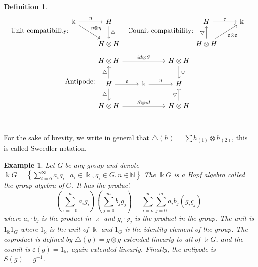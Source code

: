 \documentclass[12pt,a4paper]{article}
\newtheorem{example}[theorem]{Example}
\newtheorem{definition}[theorem]{Definition}
\newcommand\NN{\mathbb{N}}
\newcommand{\kk}{\Bbbk}
\newcommand\1{_{(1)}}
\newcommand\2{_{(2)}}
\begin{document}
\begin{definition}
\[\text{Unit compatibility:}\begin{tikzcd}
\kk \arrow[rd, "\eta\otimes\eta"] \arrow[r, "\eta"] & H \arrow[d, "\triangle"] \\
                                                    & H\otimes H              
\end{tikzcd}
\text{\;\;\;Counit compatibility:}
\begin{tikzcd}
H \arrow[r, "\varepsilon"]                                                         & \kk \\
H\otimes H \arrow[u, "\bigtriangledown"] \arrow[ru, "\varepsilon\otimes\varepsilon"'] &    
\end{tikzcd}
\]
\[
\text{Antipode:}
\begin{tikzcd}
H\otimes H \arrow[rr, "id\otimes S"]                                      &                       & H\otimes H \arrow[d, "\bigtriangledown"] \\
H \arrow[u, "\triangle"] \arrow[d, "\triangle"'] \arrow[r, "\varepsilon"] & \kk \arrow[r, "\eta"] & H                                     \\
H\otimes H \arrow[rr, "S\otimes id"]                                      &                       & H\otimes H \arrow[u, "\bigtriangledown"]
\end{tikzcd}
\]\\
\end{definition}

For the sake of brevity, we write in general that $\triangle(h)=\sum h\1\otimes h\2$, this is called Sweedler notation.\\

\begin{example}
    Let $G$ be any group and denote $\kk G=\left\{\sum_{i=0}^\infty a_i g_i\;\vert\; a_i\in\kk, g_i\in G, n\in\NN\right\}$
    The $\kk G$ is a Hopf algebra called the group algebra of $G$.
    It has the product
    \[
    \left(\sum_{i=-0}^n a_i g_i\right)\left(\sum_{j=0}^m b_j g_j\right)=\sum_{i=o}^n\sum_{j=0}^m a_i b_j (g_i g_j)
    \]
    where $a_i\cdot b_j$ is the product in $\kk$ and $g_i\cdot g_j$ is the product in the group.
    The unit is $1_\kk 1_G$ where $1_\kk$ is the unit of $\kk$ and $1_G$ is the identity element of the group.
    The coproduct is defined by $\triangle(g)=g\otimes g$ extended linearly to all of $\kk G$, and the counit is $\varepsilon(g)=1_\kk$, again extended linearly.
    Finally, the antipode is $S(g)=g^{-1}$.
\end{example}
\end{document}
